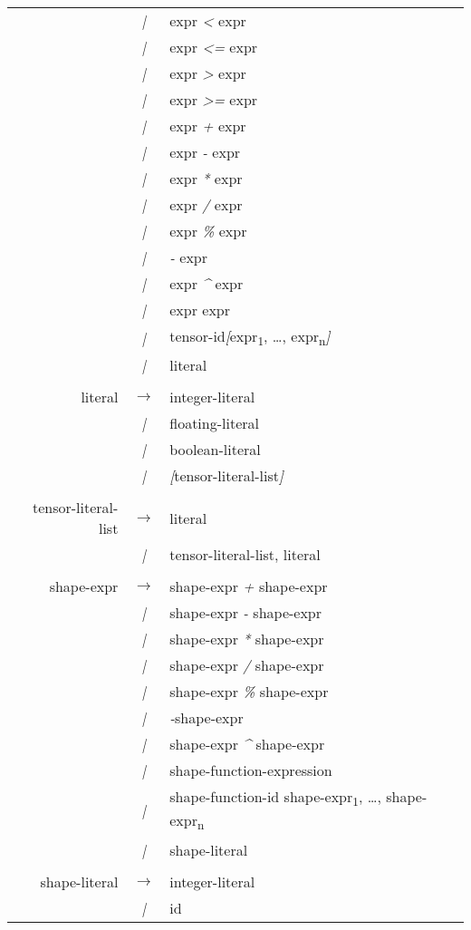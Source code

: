 \begin{tt}
{\begin{center}
\begin{longtable}{r c l}
& \emph{|} & expr \emph{<} expr \\
& \emph{|} & expr \emph{<=} expr \\
& \emph{|} & expr \emph{>} expr \\
& \emph{|} & expr \emph{>=} expr \\
& \emph{|} & expr \emph{+} expr \\
& \emph{|} & expr \emph{-} expr \\
& \emph{|} & expr \emph{*} expr \\
& \emph{|} & expr \emph{/} expr \\
& \emph{|} & expr \emph{\%} expr \\
& \emph{|} & \emph{-} expr \\
& \emph{|} & expr \emph{\^} expr \\
& \emph{|} & expr expr \\
& \emph{|} & tensor-id\emph{[}expr\textsubscript{1}, \ldots, expr\textsubscript{n}\emph{]} \\
& \emph{|} & literal \\
& & \\
literal & $\rightarrow$ &  integer-literal \\
& \emph{|} & floating-literal \\
& \emph{|} & boolean-literal \\
& \emph{|} & \emph{[}tensor-literal-list\emph{]} \\
& & \\
tensor-literal-list & $\rightarrow$ & 
        literal\\
& \emph{|} & tensor-literal-list, literal\\
& & \\
shape-expr & $\rightarrow$ & shape-expr \emph{+} shape-expr \\
& \emph{|} & shape-expr \emph{-} shape-expr \\
& \emph{|} & shape-expr \emph{*} shape-expr \\
& \emph{|} & shape-expr \emph{/} shape-expr \\
& \emph{|} & shape-expr \emph{\%} shape-expr \\
& \emph{|} & \emph{-}shape-expr \\
& \emph{|} & shape-expr \emph{\^} shape-expr \\
& \emph{|} & shape-function-expression \\
& \emph{|} & shape-function-id shape-expr\textsubscript{1}, \ldots, shape-expr\textsubscript{n} \\
& \emph{|} & shape-literal \\
& & \\
shape-literal & $\rightarrow$ & integer-literal \\
& \emph{|} & id \\
\end{longtable}
\end{center}
}
\end{tt}

